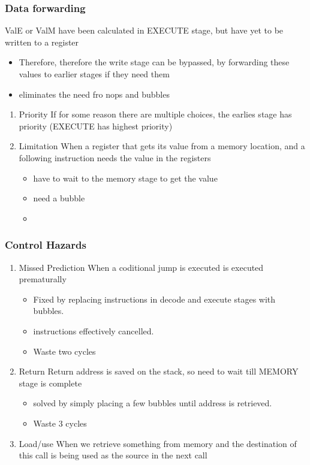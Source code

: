 \documentclass[11pt]{article}
\begin{document}
\subsubsection{Data forwarding}
\label{sec:orgheadline46}
ValE or ValM have been calculated in EXECUTE stage, but have yet to be written to a register 
\begin{itemize}
\item Therefore, therefore the write stage can be bypassed, by forwarding these values to earlier stages if they need them
\item eliminates the need fro nops and bubbles
\end{itemize}
\begin{enumerate}
\item Priority
\label{sec:orgheadline44}
If for some reason there are multiple choices, the earlies stage has priority (EXECUTE has highest priority)
\item Limitation
\label{sec:orgheadline45}
When a register that gets its value from a memory location, and a following instruction needs the value in the registers
\begin{itemize}
\item have to wait to the memory stage to get the value
\item need a bubble
\item 
\end{itemize}
\end{enumerate}

\subsubsection{Control Hazards}
\label{sec:orgheadline50}
\begin{enumerate}
\item Missed Prediction
\label{sec:orgheadline47}
When a coditional jump is executed is executed prematurally 
\begin{itemize}
\item Fixed by replacing instructions in decode and execute stages with bubbles.
\item instructions effectively cancelled.
\item Waste two cycles
\end{itemize}
\item Return
\label{sec:orgheadline48}
Return address is saved on the stack, so need to wait till MEMORY stage is complete
\begin{itemize}
\item solved by simply placing a few bubbles until address is retrieved.
\item Waste 3 cycles
\end{itemize}
\item Load/use
\label{sec:orgheadline49}
When we retrieve something from memory and the destination of this call is being used as the source in the next call
\end{enumerate}
\end{document}
